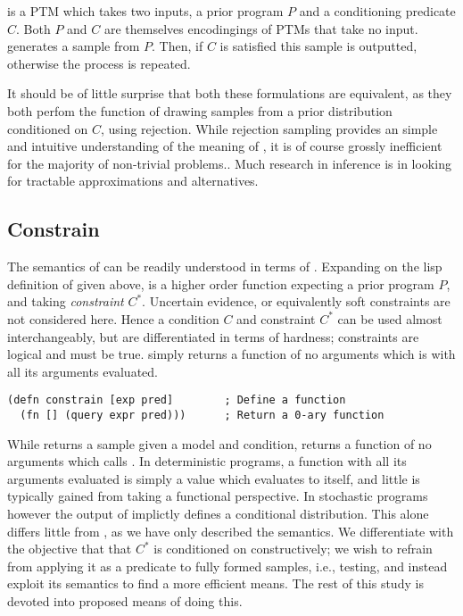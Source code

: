  is a PTM which takes two inputs, a prior program $P$ and a conditioning predicate $C$.
Both $P$ and $C$ are themselves encodingings of PTMs that take no input.
 generates a sample from $P$.
Then, if $C$ is satisfied this sample is outputted, otherwise the process is repeated.

It should be of little surprise that both these formulations are equivalent, as they both perfom the function of drawing samples from a prior distribution conditioned on $C$, using rejection.
While rejection sampling provides an simple and intuitive understanding of the meaning of , it is of course grossly inefficient for the majority of non-trivial problems..
Much research in inference is in looking for tractable approximations and alternatives.

\subsection{Constrain}
The semantics of  can be readily understood in terms of .
Expanding on the lisp definition of  given above,  is a higher order function expecting a prior program $P$, and taking \textit{constraint} $C^*$.
Uncertain evidence, or equivalently soft constraints are not considered here.
Hence a condition $C$ and constraint $C^*$ can be used almost interchangeably, but are differentiated in terms of hardness; constraints are logical and must be true.
 simply returns a function of no arguments which is  with all its arguments evaluated.

\begin{verbatim}
(defn constrain [exp pred]        ; Define a function
  (fn [] (query expr pred)))      ; Return a 0-ary function
\end{verbatim}

While  returns a sample given a model and condition,  returns a function of no arguments which calls .
In deterministic programs, a function with all its arguments evaluated is simply a value which evaluates to itself, and little is typically gained from taking a functional perspective. In stochastic programs however the output of  implictly defines a conditional distribution.
This alone differs little from , as we have only described the semantics.
We differentiate with the objective that that $C^*$ is conditioned on constructively; we wish to refrain from applying it as a predicate to fully formed samples, i.e., testing, and instead exploit its semantics to find a more efficient means.
The rest of this study is devoted into proposed means of doing this.

